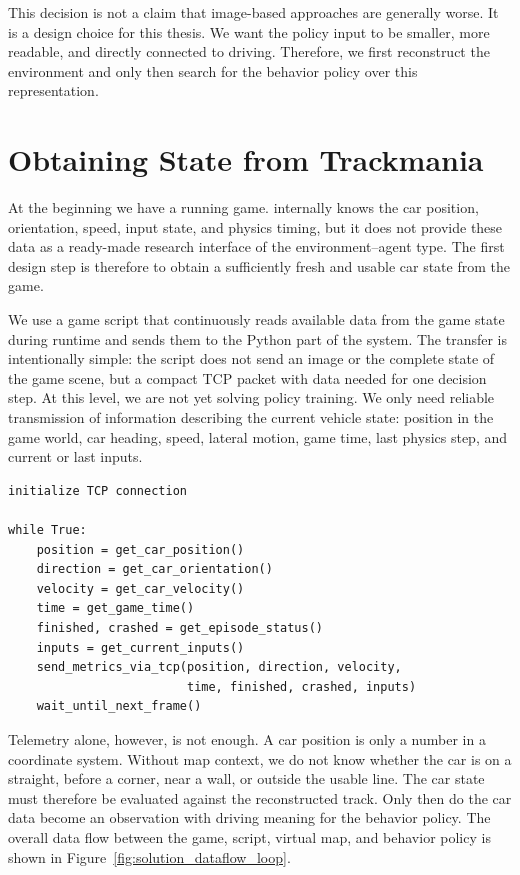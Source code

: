 This decision is not a claim that image-based approaches are generally worse. It is a design choice for this thesis. We want the policy input to be smaller, more readable, and directly connected to driving. Therefore, we first reconstruct the environment and only then search for the behavior policy over this representation.

\section{Obtaining State from Trackmania}

At the beginning we have a running game. \Trackmania{} internally knows the car position, orientation, speed, input state, and physics timing, but it does not provide these data as a ready-made research interface of the environment--agent type. The first design step is therefore to obtain a sufficiently fresh and usable car state from the game.

We use a game script that continuously reads available data from the game state during runtime and sends them to the Python part of the system. The transfer is intentionally simple: the script does not send an image or the complete state of the game scene, but a compact TCP packet with data needed for one decision step. At this level, we are not yet solving policy training. We only need reliable transmission of information describing the current vehicle state: position in the game world, car heading, speed, lateral motion, game time, last physics step, and current or last inputs.

\begin{lstlisting}[caption={High-level pseudocode of the game script},label={alg:game_script_tcp}]
initialize TCP connection

while True:
    position = get_car_position()
    direction = get_car_orientation()
    velocity = get_car_velocity()
    time = get_game_time()
    finished, crashed = get_episode_status()
    inputs = get_current_inputs()
    send_metrics_via_tcp(position, direction, velocity,
                         time, finished, crashed, inputs)
    wait_until_next_frame()
\end{lstlisting}

Telemetry alone, however, is not enough. A car position is only a number in a coordinate system. Without map context, we do not know whether the car is on a straight, before a corner, near a wall, or outside the usable line. The car state must therefore be evaluated against the reconstructed track. Only then do the car data become an observation with driving meaning for the behavior policy. The overall data flow between the game, script, virtual map, and behavior policy is shown in Figure~\ref{fig:solution_dataflow_loop}.


